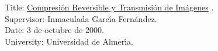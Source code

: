 Title:
\href{http://www.hpca.ual.es/~vruiz/papers/tesis.pdf}{Compresi\'on Reversible y Transmisi\'on de Im\'agenes} .\\
Supervisor: Inmaculada Garc\'{\i}a Fern\'andez. \\
Date: 3 de octubre de 2000. \\
University: Universidad de Almer\'{\i}a.
